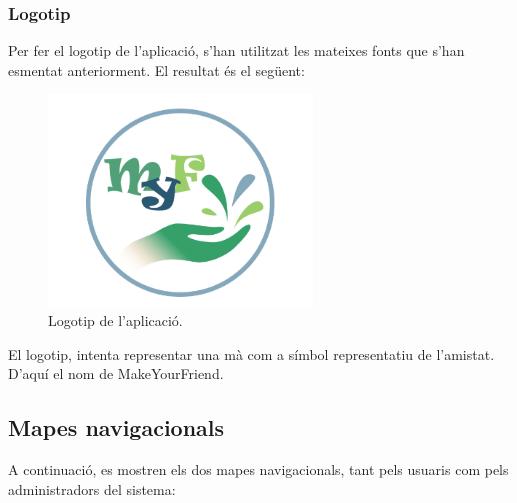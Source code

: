 \documentclass[11pt,catalan,listoffigures,listoftables]{tfgetsinf}
\begin{document}
\subsubsection{Logotip}

Per fer el logotip de l'aplicació, s'han utilitzat les mateixes fonts que s'han esmentat anteriorment.
El resultat és el següent:

\begin{figure}[h]
\includegraphics[width=7cm]{images/image3}
\centering
\caption[Figura 4.3]{Logotip de l'aplicació.}
\centering
\end{figure}

\noindent El logotip, intenta representar una mà com a símbol representatiu de l'amistat. D'aquí el nom de MakeYourFriend.

\subsection{Mapes navigacionals}

A continuació, es mostren els dos mapes navigacionals, tant pels usuaris com pels administradors del sistema:
\end{document}
